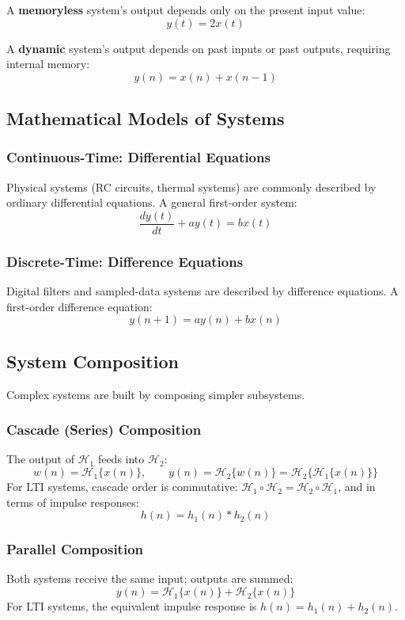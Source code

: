 \documentclass[11pt]{article}
\begin{document}
A \textbf{memoryless} system's output depends only on the present input value:
\[
  y(t) = 2x(t)
\]

A \textbf{dynamic} system's output depends on past inputs or past outputs, requiring internal memory:
\[
  y(n) = x(n) + x(n-1)
\]

\subsection{Mathematical Models of Systems}

\subsubsection{Continuous-Time: Differential Equations}
Physical systems (RC circuits, thermal systems) are commonly described by ordinary differential equations. A general first-order system:
\[
  \frac{dy(t)}{dt} + ay(t) = bx(t)
\]

\subsubsection{Discrete-Time: Difference Equations}
Digital filters and sampled-data systems are described by difference equations. A first-order difference equation:
\[
  y(n+1) = ay(n) + bx(n)
\]

\subsection{System Composition}

Complex systems are built by composing simpler subsystems.

\subsubsection{Cascade (Series) Composition}
The output of $\mathcal{H}_1$ feeds into $\mathcal{H}_2$:
\[
  w(n) = \mathcal{H}_1\{x(n)\}, \qquad y(n) = \mathcal{H}_2\{w(n)\} = \mathcal{H}_2\{\mathcal{H}_1\{x(n)\}\}
\]
For LTI systems, cascade order is commutative: $\mathcal{H}_1 \circ \mathcal{H}_2 = \mathcal{H}_2 \circ \mathcal{H}_1$, and in terms of impulse responses:
\[
  h(n) = h_1(n) * h_2(n)
\]

\subsubsection{Parallel Composition}
Both systems receive the same input; outputs are summed:
\[
  y(n) = \mathcal{H}_1\{x(n)\} + \mathcal{H}_2\{x(n)\}
\]
For LTI systems, the equivalent impulse response is $h(n) = h_1(n) + h_2(n)$.
\end{document}
